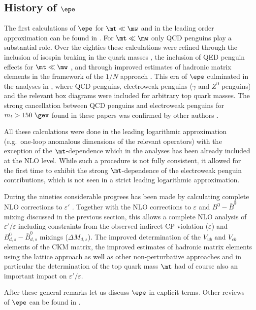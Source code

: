 \subsection{History of $\epe$}
The first calculations of $\epe$ for $\mt \ll \mw$ and in the leading
order approximation can be found in \cite{GW79}. 
For $\mt \ll \mw$ only QCD
penguins play a substantial role. Over the eighties these calculations
were refined through the inclusion of isospin braking in the
quark masses \cite{donoghueetal:86,burasgerard:87,lusignoli:89},
the inclusion of QED penguin effects for $\mt \ll \mw$
\cite{BW84,donoghueetal:86,burasgerard:87}, 
and through improved estimates of hadronic matrix elements in
the framework of the $1/N$ approach \cite{bardeen:87}. 
This era of $\epe$ culminated
in the analyses in \cite{flynn:89,buchallaetal:90}, where QCD
penguins, electroweak penguins ($\gamma$ and $Z^0$ penguins)
and the relevant box diagrams were included for arbitrary
top quark masses. The strong cancellation between QCD penguins
and electroweak penguins for $m_t > 150~\gev$ found in these
papers was confirmed by other authors \cite{PW91}.

All these calculations were done in the leading logarithmic
approximation (e.g.\ one-loop anomalous dimensions of the relevant
operators) with the exception of the $\mt$-dependence which in 
the analyses \cite{flynn:89,buchallaetal:90,PW91} has been already
included at the NLO level. While such a procedure is not fully
consistent, it allowed for the first time to exhibit the strong
$\mt$-dependence of the electroweak penguin contributions,
which is not seen in a strict leading logarithmic approximation.

During the nineties considerable progrees has been made by
calculating complete NLO corrections to $\varepsilon'$
\cite{BJLW1,BJLW2,BJLW,ROMA1,ROMA2}. Together with the NLO
corrections to $\varepsilon$ and $B^0-\bar B^0$ mixing
discussed in the previous section, this allows
a complete NLO analysis of $\varepsilon'/\varepsilon$ including
constraints from the observed indirect CP violation ($\varepsilon$)
and  $B_{d,s}^0-\bar B_{d,s}^0$ mixings ($\Delta M_{d,s}$). The improved
determination of the $V_{ub}$ and $V_{cb}$ elements of the CKM matrix,
the improved estimates of hadronic matrix elements using the lattice 
approach as well as other non-perturbative approaches 
and in particular the determination of the top quark mass
$\mt$ had of course also an important impact on
$\varepsilon'/\varepsilon$. 

After these general remarks let us discuss 
$\epe$ in explicit terms. Other reviews of $\epe$ can be found
in \cite{WW,BERT98}.
